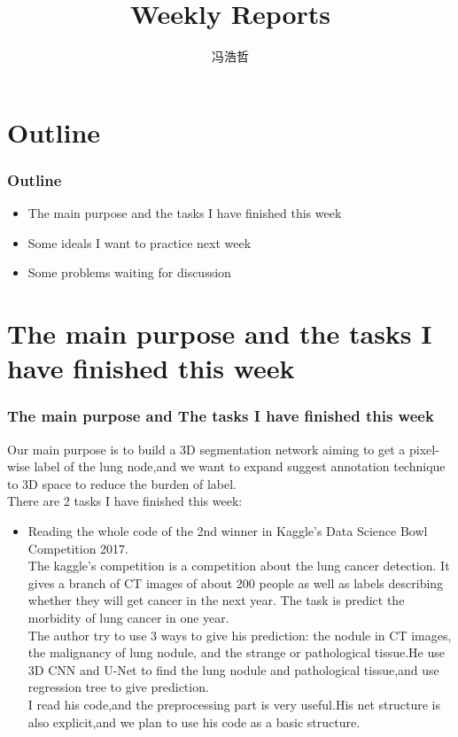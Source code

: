 \documentclass[8pt]{beamer}
\title{Weekly Reports}
\author{冯浩哲}
\begin{document}
	\frame{\titlepage}
		
	
	\section*{Outline}	

\begin{frame}[fragile]
\frametitle{Outline}
\begin{itemize}  
	
\item  The main purpose and the tasks I have finished this week
\vspace{.5cm} 
\item  Some ideals I want to practice next week
\vspace{.5cm} 
\item  Some problems waiting for discussion
\vspace{.5cm} 
\end{itemize}
\end{frame}

\section*{The main purpose and the tasks I have finished this week}	
\begin{frame}[fragile]
\frametitle{The main purpose and The tasks I have finished this week}
Our main purpose is to build a 3D segmentation network aiming to get a pixel-wise label
of the lung node,and we want to expand suggest annotation technique to 3D space to reduce the burden of label.
\\
There are 2 tasks I have finished this week:\\
\vspace{.3cm}
\begin{itemize}
	\item Reading the whole code of the 2nd winner in Kaggle's Data Science Bowl Competition 2017.\\
	\vspace{.3cm}
	The kaggle's competition is a competition about the lung cancer detection. It gives a branch of CT images of about 200 people as well as labels describing whether they will get cancer in the next year. The task is predict the morbidity of lung cancer in one year.\\
	\vspace{.3cm}
	The author try to use 3 ways to give his prediction: the nodule in CT images, the malignancy of lung nodule, and the strange or pathological tissue.He use 3D CNN and U-Net to find the lung nodule and pathological tissue,and use regression tree to give prediction.\\
	\vspace{.3cm}
	I read his code,and the preprocessing part is very useful.His net structure is also explicit,and we plan to use his code as a basic structure.

	
\end{itemize}
\end{frame}	
\end{document}
